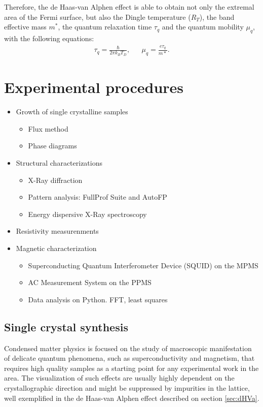 \documentclass[prd,amsfonts,onecolumn,superscriptaddress,aps,nofootinbib,11pt]{revtex4}
\begin{document}
Therefore, the de Haas-van Alphen effect is able to obtain not only the extremal area of the Fermi surface, but also the Dingle temperature ($R_T$), the band effective mass $m^*$, the quantum relaxation time $\tau_q$ and the quantum mobility $\mu_q$, with the following equations: 
\begin{align}
    \tau_q = \frac{\hbar}{2 \pi k_B T_D}, && \mu_q = \frac{e \tau_q}{m*}.
\end{align}


 

\section{Experimental procedures}
\label{sec:experimentos}

\begin{itemize}
    \item Growth of single crystalline samples
    \begin{itemize}
        \item Flux method
        \item Phase diagrams
    \end{itemize}
    \item Structural characterizations
    \begin{itemize}
        \item X-Ray diffraction
        \item Pattern analysis: FullProf Suite and AutoFP
        \item Energy dispersive X-Ray spectroscopy
    \end{itemize}
    \item Resistivity measurenments
    \item Magnetic characterization
    \begin{itemize}
        \item Superconducting Quantum Interferometer Device (SQUID) on the MPMS
        \item AC Measurement System on the PPMS
        \item Data analysis on Python. FFT, least squares
    \end{itemize}
\end{itemize}

\subsection{Single crystal synthesis}

Condensed matter physics is focused on the study of macroscopic manifestation of delicate quantum phenomena, such as superconductivity and magnetism, that requires high quality samples as a starting point for any experimental work in the area. The visualization of such effects are usually highly dependent on the crystallographic direction and might be suppressed by impurities in the lattice, well exemplified in the de Haas-van Alphen effect described on section \ref{sec:dHVa}.
\end{document}
